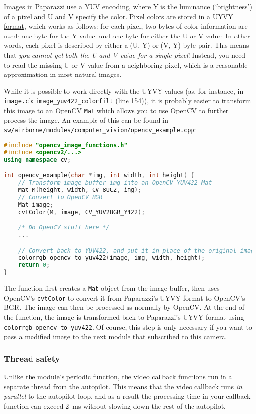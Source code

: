 \documentclass{article}
\begin{document}
Images in Paparazzi use a \href{https://en.wikipedia.org/wiki/YUV}{YUV encoding}, where Y is the luminance (`brightness') of a pixel and U and V specify the color. Pixel colors are stored in a \href{https://www.fourcc.org/pixel-format/yuv-uyvy/}{UYVY format}, which works as follows: for each pixel, two bytes of color information are used: one byte for the Y value, and one byte for either the U or V value. In other words, each pixel is described by either a (U, Y) or (V, Y) byte pair.
This means that \emph{you cannot get both the U and V value for a single pixel}! Instead, you need to read the missing U or V value from a neighboring pixel, which is a reasonable approximation in most natural images.

While it is possible to work directly with the UYVY values (as, for instance, in \texttt{image.c}'s \texttt{image\_yuv422\_colorfilt} (line 154)), it is probably easier to transform this image to an OpenCV \texttt{Mat} which allows you to use OpenCV to further process the image. An example of this can be found in \texttt{sw/airborne/modules/computer\_vision/opencv\_example.cpp}:

\begin{lstlisting}[language=c++]
#include "opencv_image_functions.h"
#include <opencv2/...>
using namespace cv;

int opencv_example(char *img, int width, int height) {
	// Transform image buffer img into an OpenCV YUV422 Mat
	Mat M(height, width, CV_8UC2, img);
	// Convert to OpenCV BGR
	Mat image;
	cvtColor(M, image, CV_YUV2BGR_Y422);

	/* Do OpenCV stuff here */
	...

	// Convert back to YUV422, and put it in place of the original image
	colorrgb_opencv_to_yuv422(image, img, width, height);
	return 0;
}
\end{lstlisting}
The function first creates a \texttt{Mat} object from the image buffer, then uses OpenCV's \texttt{cvtColor} to convert it from Paparazzi's UYVY format to OpenCV's BGR. The image can then be processed as normally by OpenCV.
At the end of the function, the image is transformed back to Paparazzi's UYVY format using \texttt{colorrgb\_opencv\_to\_yuv422}. Of course, this step is only necessary if you want to pass a modified image to the next module that subscribed to this camera.

\subsubsection{Thread safety}
Unlike the module's periodic function, the video callback functions run in a separate thread from the autopilot. This means that the video callback runs \emph{in parallel} to the autopilot loop, and as a result the processing time in your callback function can exceed 2~ms without slowing down the rest of the autopilot.
\end{document}
